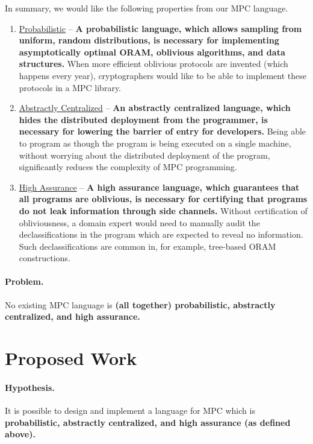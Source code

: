 \documentclass{report}
\begin{document}
In summary, we would like the following properties from our MPC language.

\begin{enumerate}
\item \label{itm:probabilistic} \underline{Probabilistic} -- \textbf{A probabilistic language, which allows sampling from uniform, random distributions, is necessary
  for implementing asymptotically optimal ORAM, oblivious algorithms, and data structures.}
  When more efficient oblivious protocols are invented (which happens every year), cryptographers would like to be able to
  implement these protocols in a MPC library.
\item \label{itm:centralized} \underline{Abstractly Centralized} -- \textbf{An abstractly centralized language, which hides the distributed deployment from the
  programmer, is necessary for lowering the barrier of entry for developers.}
  Being able to program as though the program is being executed on a single machine, without worrying about the distributed deployment
  of the program, significantly reduces the complexity of MPC programming.
\item \label{itm:assurance} \underline{High Assurance} -- \textbf{A high assurance language, which guarantees that all programs are oblivious, is necessary
  for certifying that programs do not leak information through side channels.} Without certification of obliviousness, a domain expert
  would need to manually audit the declassifications in the program which are expected to reveal no information. Such declassifications
  are common in, for example, tree-based ORAM constructions.
\end{enumerate}

\paragraph{Problem.} No existing MPC language is \textbf{(all together) probabilistic, abstractly centralized, and high assurance.}

\section{Proposed Work}

\paragraph{Hypothesis.} It is possible to design and implement a language for MPC which is \textbf{probabilistic, abstractly centralized,
  and high assurance (as defined above).}
\end{document}
